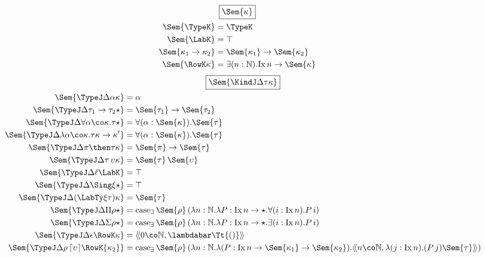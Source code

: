 \documentclass[authoryear,acmsmall,screen]{acmart}
\newcommand\Absurd{\ensuremath{\lambdabar\mathrm{\Tt{()}}}}
\newcommand\Nat{\mathbb{N}}
\newcommand\Ix[1]{\mathrm{Ix} \, #1}
\newcommand\Ixed[1]{\ensuremath{\Sem{#1}}}
\newcommand\TyPair[3]{\ensuremath{\langle\!\langle #1 \co #2 , #3 \rangle\!\rangle}}
\newcommand\Lift[1]{\ensuremath{\lceil #1 \rceil}}
\renewcommand\Case{\mathrm{case}}
\newcommand\CaseP[2]{\ensuremath{\Case_{\mathrm{\exists}} \, #1 \, #2 }}
\begin{document}
\begin{figure}[H]
\begin{gather*}
\fbox{$\Ixed{\kappa}$} \\
\begin{align*}
\vspace{5em}
\Ixed{\TypeK} &= \TypeK \\
\Ixed{\LabK} &= \top \\
\Ixed{\kappa_1 \to \kappa_2} &= \Ixed{\kappa_1} \to \Ixed{\kappa_2} \\
\Ixed{\RowK \kappa} &= \exists(n : \Nat). \Ix  n \to \Ixed{\kappa} \\
\end{align*}
\end{gather*}
\begin{gather*}
\fbox{$\Ixed{\KindJ \Delta \tau \kappa}$} \\
\begin{align*}
\vspace{5em}
\Ixed{\TypeJ \Delta \alpha \kappa} &= \alpha \\
\Ixed{\TypeJ \Delta {\tau_1 \to \tau_2} \star} &= \Ixed{\tau_1} \to \Ixed{\tau_2} \\
\Ixed{\TypeJ \Delta {\forall \alpha \co \kappa. \tau} \star} &= \forall (\alpha : \Ixed{\kappa}).\Ixed{\tau} \\
\Ixed{\TypeJ \Delta {\lambda \alpha \co \kappa. \tau} {\kappa \to \kappa'}} &= \forall (\alpha : \Ixed{\kappa}).\Ixed{\tau} \\
\Ixed{\TypeJ \Delta {\pi \then \tau} \kappa} &= \Ixed{\pi} \to \Ixed{\tau} \\
\Ixed{\TypeJ \Delta {\tau \, \upsilon} \kappa} &= \Ixed{\tau} \, \Ixed{\upsilon} \\
\Ixed{\TypeJ \Delta \ell {\LabK}} &= \top  \\
\Ixed{\TypeJ \Delta {\Sing \xi} \star} &= \top  \\
\Ixed{\TypeJ \Delta {(\LabTy \xi \tau)} \kappa}&= \Ixed{\tau}  \\
\Ixed{\TypeJ \Delta {\Pi \rho} \star}&= \CaseP {\Ixed{\rho}} {(\lambda n : \Nat. \lambda P : \Ix{n} \to \star. \forall (i : \Ix{n}). P \, i)}\\
\Ixed{\TypeJ \Delta {\Sigma \rho} \star}&= \CaseP {\Ixed{\rho}} {(\lambda n : \Nat. \lambda P : \Ix{n} \to \star. \exists (i : {\Ix n}). P \, i)}\\
\Ixed{\TypeJ \Delta \epsilon {\RowK \kappa}} &= \TyPair 0 \Nat \Absurd \\
\Ixed{\TypeJ \Delta {\rho \, \Lift{\upsilon}} {\RowK {\kappa_{2}}}} &= \CaseP {\Ixed \rho} {(\lambda n : \Nat. \lambda (P : \Ix n \to \Sem{\kappa_{1}} \to \Sem{\kappa_{2}}).  \TyPair {n} {\Nat} {\lambda (j : \Ix n). (P \, j) \Sem{\tau} })} \\

\end{align*}
\end{gather*}
\end{figure}
\end{document}
